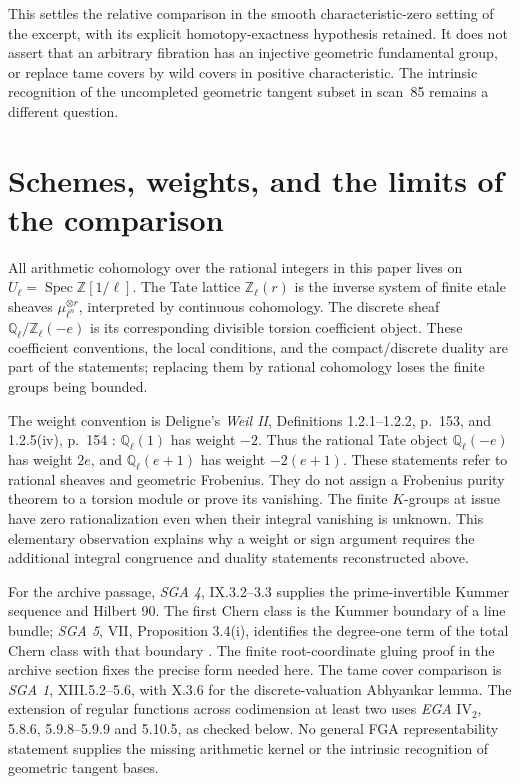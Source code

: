 \documentclass[11pt,a4paper]{article}
\theoremstyle{definition}
\begin{document}
This settles the relative comparison in the smooth
characteristic-zero setting of the excerpt, with its explicit
homotopy-exactness hypothesis retained. It does not assert that an
arbitrary fibration has an injective geometric fundamental group,
or replace tame covers by wild covers in positive characteristic.
The intrinsic recognition of the uncompleted geometric tangent
subset in scan~85 remains a different question.

\section{Schemes, weights, and the limits of the comparison}
\label{sec:framework}

All arithmetic cohomology over the rational integers in this paper lives on
$U_\ell=\operatorname{Spec}\mathbb Z[1/\ell]$. The Tate lattice
$\mathbb Z_\ell(r)$ is the inverse system of finite etale sheaves
$\mu_{\ell^n}^{\otimes r}$, interpreted by continuous cohomology.
The discrete sheaf $\mathbb Q_\ell/\mathbb Z_\ell(-e)$ is its corresponding
divisible torsion coefficient object. These coefficient conventions,
the local conditions, and the compact/discrete duality are part of the
statements; replacing them by rational cohomology loses the finite groups
being bounded.

The weight convention is Deligne's \emph{Weil II}, Definitions 1.2.1--1.2.2,
p.~153, and 1.2.5(iv), p.~154 \cite{DeligneWeilII}: $\mathbb Q_\ell(1)$ has weight $-2$.
Thus the rational Tate object $\mathbb Q_\ell(-e)$ has weight $2e$,
and $\mathbb Q_\ell(e+1)$ has weight $-2(e+1)$. These statements refer
to rational sheaves and geometric Frobenius. They do not assign a
Frobenius purity theorem to a torsion module or prove its vanishing.
The finite $K$-groups at issue have zero rationalization even when their
integral vanishing is unknown. This elementary observation explains why
a weight or sign argument requires the additional integral congruence
and duality statements reconstructed above.

For the archive passage, \emph{SGA 4}, IX.3.2--3.3 supplies the
prime-invertible Kummer sequence and Hilbert 90. The first Chern class
is the Kummer boundary of a line bundle; \emph{SGA 5}, VII,
Proposition 3.4(i), identifies the degree-one term of the total Chern
class with that boundary \cite{SGA5}. The finite root-coordinate gluing proof in
the archive section fixes the precise form needed here. The tame
cover comparison is \emph{SGA 1}, XIII.5.2--5.6, with X.3.6 for the
discrete-valuation Abhyankar lemma. The extension of regular functions
across codimension at least two uses \emph{EGA} $\mathrm{IV}_2$,
5.8.6, 5.9.8--5.9.9 and 5.10.5, as checked below. No general FGA
representability statement supplies the missing arithmetic kernel
or the intrinsic recognition of geometric tangent bases.
\end{document}
